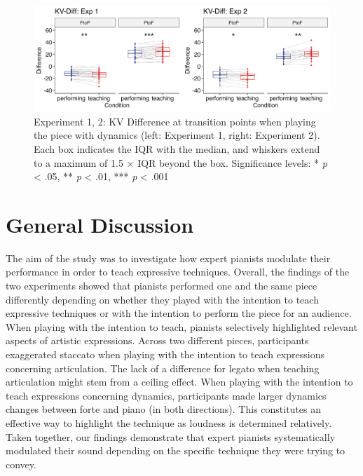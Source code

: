 \documentclass[
  english,
  man,floatsintext]{apa6}
\begin{document}
\begin{figure}
\includegraphics[width=1\linewidth]{manuscript_files/figure-latex/plot-vel-diff-1} \caption{\label{fig:vel-diff}Experiment 1, 2: KV Difference at transition points when playing the piece with dynamics (left: Experiment 1, right: Experiment 2). Each box indicates the IQR with the median, and whiskers extend to a maximum of 1.5 × IQR beyond the box. Significance levels: * \textit{p} < .05, ** \textit{p} < .01, *** \textit{p} < .001}\label{fig:plot-vel-diff}
\end{figure}

\newpage

\hypertarget{general-discussion}{%
\section{General Discussion}\label{general-discussion}}

The aim of the study was to investigate how expert pianists modulate their performance in order to teach expressive techniques. Overall, the findings of the two experiments showed that pianists performed one and the same piece differently depending on whether they played with the intention to teach expressive techniques or with the intention to perform the piece for an audience. When playing with the intention to teach, pianists selectively highlighted relevant aspects of artistic expressions. Across two different pieces, participants exaggerated staccato when playing with the intention to teach expressions concerning articulation. The lack of a difference for legato when teaching articulation might stem from a ceiling effect. When playing with the intention to teach expressions concerning dynamics, participants made larger dynamics changes between forte and piano (in both directions). This constitutes an effective way to highlight the technique as loudness is determined relatively. Taken together, our findings demonstrate that expert pianists systematically modulated their sound depending on the specific technique they were trying to convey.
\end{document}
